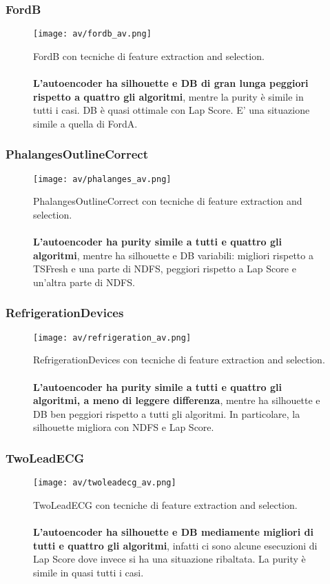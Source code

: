 \subsubsection{FordB}
\begin{figure}[H]
	\centering
	\texttt{[image: av/fordb\_av.png]}
	\caption{FordB con tecniche di feature extraction and selection.\\
	\\
	\textbf{L'autoencoder ha silhouette e DB di gran lunga peggiori rispetto a quattro gli algoritmi}, mentre la purity è simile in tutti i casi. DB è quasi ottimale con Lap Score. E' una situazione simile a quella di FordA.}
	\label{fig:fordb_av}
\end{figure}

\subsubsection{PhalangesOutlineCorrect}
\begin{figure}[H]
	\centering
	\texttt{[image: av/phalanges\_av.png]}
	\caption{PhalangesOutlineCorrect con tecniche di feature extraction and selection.\\
	\\
	\textbf{L'autoencoder ha purity simile a tutti e quattro gli algoritmi}, mentre ha silhouette e DB variabili: migliori rispetto a TSFresh e una parte di NDFS, peggiori rispetto a Lap Score e un'altra parte di NDFS.}
	\label{fig:phalanges_av}
\end{figure}

\subsubsection{RefrigerationDevices}
\begin{figure}[H]
	\centering
	\texttt{[image: av/refrigeration\_av.png]}
	\caption{RefrigerationDevices con tecniche di feature extraction and selection.\\
	\\
	\textbf{L'autoencoder ha purity simile a tutti e quattro gli algoritmi, a meno di leggere differenza}, mentre ha silhouette e DB ben peggiori rispetto a tutti gli algoritmi. In particolare, la silhouette migliora con NDFS e Lap Score.}
	\label{fig:refrigeration_av}
\end{figure}

\subsubsection{TwoLeadECG}
\begin{figure}[H]
	\centering
	\texttt{[image: av/twoleadecg\_av.png]}
	\caption{TwoLeadECG con tecniche di feature extraction and selection.\\
	\\
	\textbf{L'autoencoder ha silhouette e DB mediamente migliori di tutti e quattro gli algoritmi}, infatti ci sono alcune esecuzioni di Lap Score dove invece si ha una situazione ribaltata. La purity è simile in quasi tutti i casi.}
	\label{fig:twoleadecg_av}
\end{figure}

